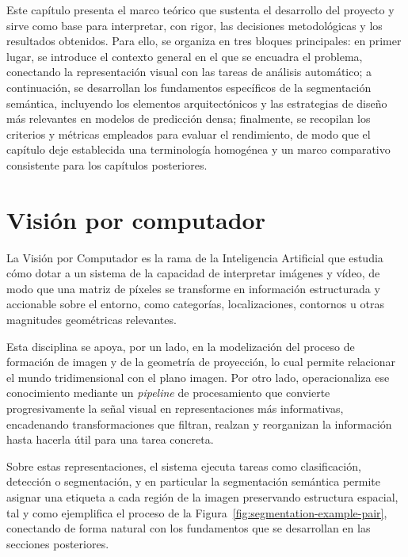 
Este capítulo presenta el marco teórico que sustenta el desarrollo del proyecto y sirve como base para interpretar, con rigor, las decisiones metodológicas y los resultados obtenidos. Para ello, se organiza en tres bloques principales: en primer lugar, se introduce el contexto general en el que se encuadra el problema, conectando la representación visual con las tareas de análisis automático; a continuación, se desarrollan los fundamentos específicos de la segmentación semántica, incluyendo los elementos arquitectónicos y las estrategias de diseño más relevantes en modelos de predicción densa; finalmente, se recopilan los criterios y métricas empleados para evaluar el rendimiento, de modo que el capítulo deje establecida una terminología homogénea y un marco comparativo consistente para los capítulos posteriores.

\section{Visión por computador}

La Visión por Computador es la rama de la Inteligencia Artificial que estudia cómo dotar a un sistema de la capacidad de interpretar imágenes y vídeo, de modo que una matriz de píxeles se transforme en información estructurada y accionable sobre el entorno, como categorías, localizaciones, contornos u otras magnitudes geométricas relevantes. 

Esta disciplina se apoya, por un lado, en la modelización del proceso de formación de imagen y de la geometría de proyección, lo cual permite relacionar el mundo tridimensional con el plano imagen. Por otro lado, operacionaliza ese conocimiento mediante un \textit{pipeline} de procesamiento que convierte progresivamente la señal visual en representaciones más informativas, encadenando transformaciones que filtran, realzan y reorganizan la información hasta hacerla útil para una tarea concreta.

Sobre estas representaciones, el sistema ejecuta tareas como clasificación, detección o segmentación, y en particular la segmentación semántica permite asignar una etiqueta a cada región de la imagen preservando estructura espacial, tal y como ejemplifica el proceso de la Figura~\ref{fig:segmentation-example-pair}, conectando de forma natural con los fundamentos que se desarrollan en las secciones posteriores.

